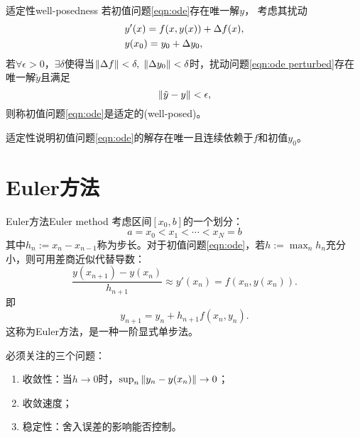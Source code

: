 \begin{definition}
    {适定性}{well-posedness}
    若初值问题\eqref{eqn:ode}存在唯一解$y$，
    考虑其扰动
    \begin{subequations}
        \label{eqn:ode perturbed}
        \begin{align}
            &y'(x)=f(x,y(x))+\Delta f(x),\\
            &y(x_0)=y_0+\Delta y_0,
        \end{align}
    \end{subequations}
    若$\forall\epsilon>0$，$\exists\delta$使得当$\left\lVert\Delta f\right\rVert<\delta,\;\left\lVert\Delta y_0\right\rVert<\delta$时，扰动问题\eqref{eqn:ode perturbed}存在唯一解$\tilde y$且满足
    \begin{equation}
        \left\lVert\tilde y-y\right\rVert<\epsilon,
    \end{equation}
    则称初值问题\eqref{eqn:ode}是适定的(well-posed)。
\end{definition}

\begin{remark}
    适定性说明初值问题\eqref{eqn:ode}的解存在唯一且连续依赖于$f$和初值$y_0$。
\end{remark}

\section{Euler方法}

\begin{theorem}
    {Euler方法}{Euler method}
    考虑区间$[x_0,b]$的一个划分：
    \[
        a=x_0<x_1<\cdots<x_N=b
    \]
    其中$h_n:=x_n-x_{n-1}$称为步长。对于初值问题\eqref{eqn:ode}，若$h:=\max_n h_n$充分小，则可用差商近似代替导数：
    \[
        \frac{y(x_{n+1})-y(x_n)}{h_{n+1}}\approx y'(x_n)=f(x_n,y(x_n)).
    \]
    即
    \begin{equation}
        \label{eqn:Euler}
        y_{n+1}=y_n+h_{n+1}f(x_n,y_n).
    \end{equation}
    这称为Euler方法，是一种一阶显式单步法。
\end{theorem}

\begin{remark}
    必须关注的三个问题：
    \begin{enumerate}
        \item 收敛性：当$h\to0$时，$\sup_n\left\lVert y_n-y(x_n)\right\rVert\to0$；
        \item 收敛速度；
        \item 稳定性：舍入误差的影响能否控制。
    \end{enumerate}
\end{remark}

